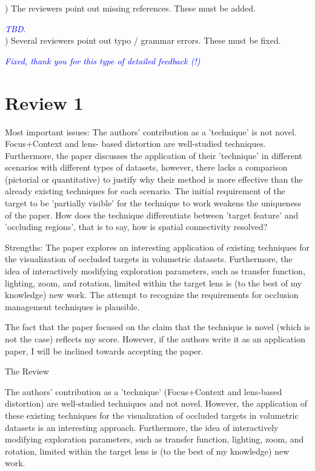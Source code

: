 \documentclass[a4paper,10pt]{article}
\newcommand{\rr}[1]{\emph{\textcolor{blue}{#1}}}
\begin{document}
) The reviewers point out missing references. These must be added.

    \rr{TBD}.\\

) Several reviewers point out typo / grammar errors. These must be fixed.

    \rr{Fixed, thank you for this type of detailed feedback (!)}

\section{Review 1}


Most important issues:
    The authors' contribution as a 'technique' is not novel. Focus+Context and lens-
    based distortion are well-studied techniques. Furthermore, the paper discusses the
    application of their 'technique' in different scenarios with different types of
    datasets, however, there lacks a comparison (pictorial or quantitative) to justify
    why their method is more effective than the already existing techniques for each
    scenario. The initial requirement of the target to be 'partially visible' for the
    technique to work weakens the uniqueness of the paper. How does the technique
    differentiate between 'target feature' and 'occluding regions', that is to say,
    how is spatial connectivity resolved?

    Strengths:
    The paper explores an interesting application of existing techniques for the
    visualization of occluded targets in volumetric datasets. Furthermore, the idea of
    interactively modifying exploration parameters, such as transfer function,
    lighting, zoom, and rotation, limited within the target lens is (to the best of my
    knowledge) new work. The attempt to recognize the requirements for occlusion
    management techniques is plausible.

    The fact that the paper focused on the claim that the technique is novel (which is
    not the case) reflects my score. However, if the authors write it as an
    application paper, I will be inclined towards accepting the paper.

  The Review

    The authors' contribution as a 'technique' (Focus+Context and lens-based
    distortion) are well-studied techniques and not novel. However, the application of
    these existing techniques for the visualization of occluded targets in volumetric
    datasets is an interesting approach. Furthermore, the idea of interactively
    modifying exploration parameters, such as transfer function, lighting, zoom, and
    rotation, limited within the target lens is (to the best of my knowledge) new
    work.
\end{document}

